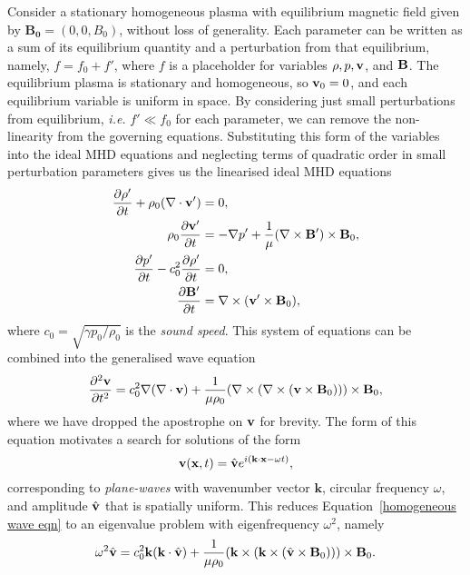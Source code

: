 Consider a stationary homogeneous plasma with equilibrium magnetic field given by $\mathbf{B_0} = (0, 0, B_0)$, without loss of generality. Each parameter can be written as a sum of its equilibrium quantity and a perturbation from that equilibrium, namely, $f = f_0 + f'$, where $f$ is a placeholder for variables $\rho, p, \mathbf{v}$, and $\mathbf{B}$. The equilibrium plasma is stationary and homogeneous, so $\mathbf{v}_0 = 0$, and each equilibrium variable is uniform in space. By considering just small perturbations from equilibrium, \textit{i.e.} $f' \ll f_0$ for each parameter, we can remove the non-linearity from the governing equations. Substituting this form of the variables into the ideal MHD equations and neglecting terms of quadratic order in small perturbation parameters gives us the linearised ideal MHD equations
\begin{align}
	\frac{\partial\rho'}{\partial t} + \rho_0(\nabla\cdot\mathbf{v}') &= 0, \label{cont eqn lin} \\
	\rho_0\frac{\partial\mathbf{v}'}{\partial t} &= -\nabla p' + \frac{1}{\mu}(\nabla\times\mathbf{B}')\times\mathbf{B}_0, \label{mom eqn lin} \\
	\frac{\partial p'}{\partial t} - c_0^2\frac{\partial\rho'}{\partial t} &= 0, \label{energy eqn lin} \\
	\frac{\partial\mathbf{B}'}{\partial t} &= \nabla\times(\mathbf{v}'\times\mathbf{B}_0), \label{ind eqn lin}
\end{align}
where $c_0 = \sqrt{\gamma p_0/\rho_0}$ is the \textit{sound speed}. This system of equations can be combined into the generalised wave equation
\begin{equation}
	\frac{\partial^2\mathbf{v}}{\partial t^2} = c_0^2\nabla(\nabla\cdot\mathbf{v}) + \frac{1}{\mu\rho_0}(\nabla\times(\nabla\times(\mathbf{v}\times\mathbf{B}_0)))\times\mathbf{B}_0, \label{homogeneous wave eqn}
\end{equation}
where we have dropped the apostrophe on $\mathbf{v}$ for brevity. The form of this equation motivates a search for solutions of the form
\begin{equation}
	\mathbf{v}(\mathbf{x}, t) = \hat{\mathbf{v}}e^{i(\mathbf{k}\cdot\mathbf{x} - \omega t)},
\end{equation}
corresponding to \textit{plane-waves} with wavenumber vector $\mathbf{k}$, circular frequency $\omega$, and amplitude $\hat{\mathbf{v}}$ that is spatially uniform. This reduces Equation~\eqref{homogeneous wave eqn} to an eigenvalue problem with eigenfrequency $\omega^2$, namely
\begin{equation}
	\omega^2\hat{\mathbf{v}} = c_0^2\mathbf{k}(\mathbf{k}\cdot\hat{\mathbf{v}}) + \frac{1}{\mu\rho_0}(\mathbf{k}\times(\mathbf{k}\times(\hat{\mathbf{v}}\times\mathbf{B}_0)))\times\mathbf{B}_0. \label{homogeneous wave eqn 2}
\end{equation}

